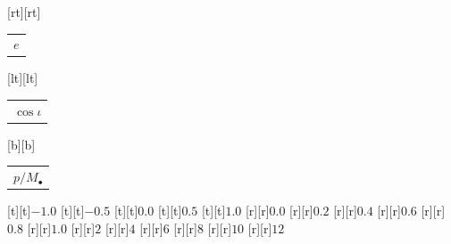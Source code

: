 %    
%
%
\begin{psfrags}%
\psfragscanon%
%
[rt][rt]{\color[rgb]{0,0,0}\setlength{\tabcolsep}{0pt}\begin{tabular}{r}{\Large$e$}\end{tabular}}%
[lt][lt]{\color[rgb]{0,0,0}\setlength{\tabcolsep}{0pt}\begin{tabular}{l}{\Large$\cos\iota$}\end{tabular}}%
[b][b]{\color[rgb]{0,0,0}\setlength{\tabcolsep}{0pt}\begin{tabular}{c}{\Large$p/M_\bullet$}\end{tabular}}%
%
[t][t]{$-1.0$}%
[t][t]{$-0.5$}%
[t][t]{$0.0$}%
[t][t]{$0.5$}%
[t][t]{$1.0$}%
%
[r][r]{$0.0$}%
[r][r]{$0.2$}%
[r][r]{$0.4$}%
[r][r]{$0.6$}%
[r][r]{$0.8$}%
[r][r]{$1.0$}%
%
[r][r]{$2$}%
[r][r]{$4$}%
[r][r]{$6$}%
[r][r]{$8$}%
[r][r]{$10$}%
[r][r]{$12$}%
%
%
\end{psfrags}%
%
